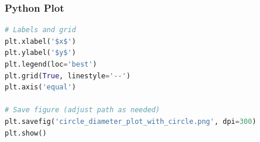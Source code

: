 \documentclass{beamer}
\theoremstyle{remark}
\numberwithin{equation}{section}
\numberwithin{equation}{section}
\begin{document}
\begin{frame}[fragile]
\frametitle{Python Plot }
\begin{lstlisting}[language=Python]
# Labels and grid
plt.xlabel('$x$')
plt.ylabel('$y$')
plt.legend(loc='best')
plt.grid(True, linestyle='--')
plt.axis('equal')

# Save figure (adjust path as needed)
plt.savefig('circle_diameter_plot_with_circle.png', dpi=300)
plt.show() 
\end{lstlisting}
\end{frame}
\end{document}
